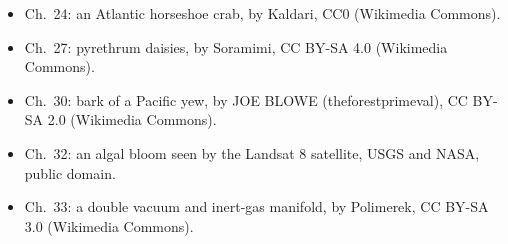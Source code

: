 \begin{itemize}
        Lycurgus cup, by Marie-Lan Nguyen, CC BY 2.5 (Wikimedia Commons).
  \item Ch.~24: an Atlantic horseshoe crab, by Kaldari, CC0 (Wikimedia
        Commons).
  \item Ch.~27: pyrethrum daisies, by Soramimi, CC BY-SA 4.0 (Wikimedia
        Commons).
  \item Ch.~30: bark of a Pacific yew, by JOE BLOWE (theforestprimeval),
        CC BY-SA 2.0 (Wikimedia Commons).
  \item Ch.~32: an algal bloom seen by the Landsat 8 satellite, USGS and NASA,
        public domain.
  \item Ch.~33: a double vacuum and inert-gas manifold, by Polimerek, CC BY-SA
        3.0 (Wikimedia Commons).
\end{itemize}
\clearpage
